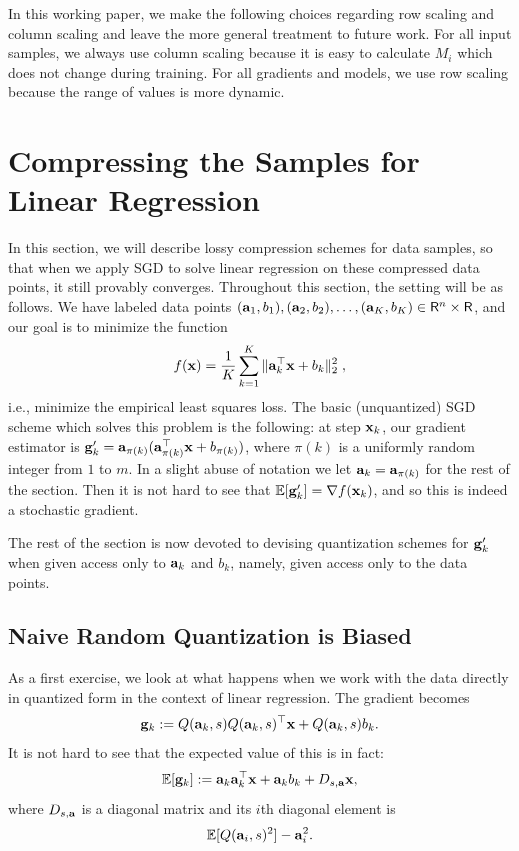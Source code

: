 \documentclass{article}
\newcommand{\R}{\mathsf{R}}
\def\a{{\bf a}}
\def\g{{\bf g}}
\def\x{{\bf x}}
\def\E{\mathbb{E}}
\begin{document}
In this working paper, we make the following choices regarding row scaling
and column scaling and leave the more general treatment to future work.
For all input samples, we always use column scaling because it is easy
to calculate $M_i$ which does not change during training. For all gradients
and models, we use row scaling because the range of values is more dynamic.

\section{Compressing the Samples for Linear Regression}

In this section, we will describe lossy compression schemes for data samples, so that when we apply SGD to solve linear regression on these compressed data points, it still provably converges.
Throughout this section, the setting will be as follows.
We have labeled data points $(\a_1, b_1), (\a_2, b_2), \ldots, (\a_K, b_K) \in \R^n \times \R$, and our goal is to minimize the function
\[
f(\x) = \frac{1}{K} \sum_{k = 1}^K \| \a_k^\top \x + b_k \|_2^2 \; ,
\]
i.e., minimize the empirical least squares loss.
The basic (unquantized) SGD scheme which solves this problem is the following: at step $\x_k$, our gradient estimator is $\g'_k = \a_{\pi(k)} (\a_{\pi(k)}^\top \x + b_{\pi(k)})$, where $\pi(k)$ is a uniformly random integer from $1$ to $m$.
In a slight abuse of notation we let $\a_k = \a_{\pi(k)}$ for the rest of the section.
Then it is not hard to see that $\E [\g'_k] = \nabla f(\x_k)$, and so this is indeed a stochastic gradient.

The rest of the section is now devoted to devising quantization schemes for $\g'_k$ when given access only to $\a_k$ and $b_k$, namely, given access only to the data points.

\subsection{Naive Random Quantization is Biased}

As a first exercise, we look at what happens when we work with the data directly in quantized form in the context of linear regression. 
The gradient becomes
\[
\g_k := Q(\a_k, s ) Q(\a_k, s)^\top \x + Q(\a_k, s) b_k.
\]
It is not hard to see that the expected value of this is in fact: 
\[
\E[\g_k] := \a_k \a_k^\top \x + \a_k b_k + D_{s, \a} \x, 
\]
where $D_{s, \a}$ is a diagonal matrix and its $i$th diagonal element is 
\[
\E[ Q(\a_i, s)^2 ] - \a_i^2.
\]
\end{document}
